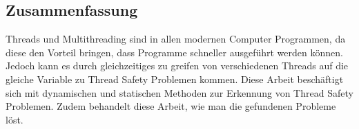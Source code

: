 \begin{otherlanguage}{ngerman}
	\chapter*{Zusammenfassung}
	Threads und Multithreading sind in allen modernen Computer Programmen, da diese den Vorteil bringen, dass Programme  schneller ausgeführt werden können. Jedoch kann es durch gleichzeitiges zu greifen von verschiedenen  Threads auf die gleiche Variable zu Thread Safety Problemen kommen. Diese Arbeit beschäftigt sich mit dynamischen und statischen Methoden zur Erkennung von Thread Safety Problemen. Zudem behandelt diese Arbeit, wie man die gefundenen Probleme löst.
\end{otherlanguage}
